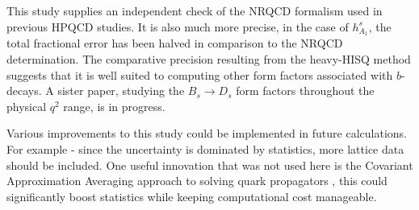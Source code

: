 This study supplies an independent check of the NRQCD formalism used in previous HPQCD studies. It is also much more precise, in the case of $h_{A_1}^s$, the total fractional error has been halved in comparison to the NRQCD determination. The comparative precision resulting from the heavy-HISQ method suggests that it is well suited to computing other form factors associated with $b$-decays. A sister paper, studying the $B_s\to D_s$ form factors throughout the physical $q^2$ range, is in progress.

Various improvements to this study could be implemented in future calculations. For example - since the uncertainty is dominated by statistics, more lattice data should be included. One useful innovation that was not used here is the Covariant Approximation Averaging approach to solving quark propagators \cite{PhysRevD.91.114511}, this could significantly boost statistics while keeping computational cost manageable.

